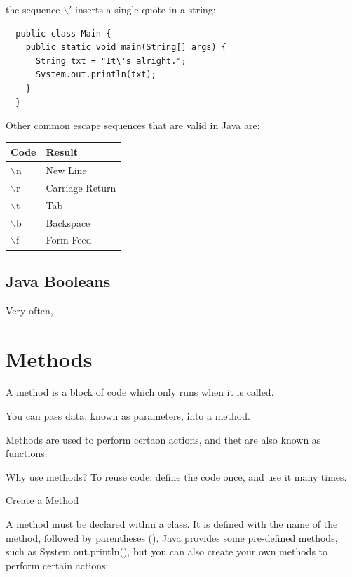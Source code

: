 the sequence $\backslash '$ inserts a single quote in a string: 

\begin{verbatim}
  public class Main {
    public static void main(String[] args) {
      String txt = "It\'s alright.";
      System.out.println(txt);
    }
  }  
\end{verbatim}

Other common escape sequences that are valid in Java are:

\begin{center}
  \begin{tabular}[t]{ l l}
    Code  &  	Result                         \\ \hline
    $\backslash$n 	  & New Line 	           \\  
    $\backslash$r 	  & Carriage Return 	   \\  
    $\backslash$t 	  & Tab 	               \\   
    $\backslash$b 	  & Backspace 	         \\  
    $\backslash$f 	  & Form Feed            \\  \hline
  \end{tabular}
\end{center}


\subsection{Java Booleans}

Very often,  

\section{Methods}

A method is a block of code which only runs when it is called.

You can pass data, known as parameters, into a method.

Methods are used to perform certaon actions, and thet are also known as functions. 

Why use methods? To reuse code: define the code once, and use it many times. 

Create a Method

A method must be declared within a class. It is defined with the name of the method, followed by parentheses (). Java provides some pre-defined methods, such as System.out.println(), but you can also create your own methods to perform certain actions:

